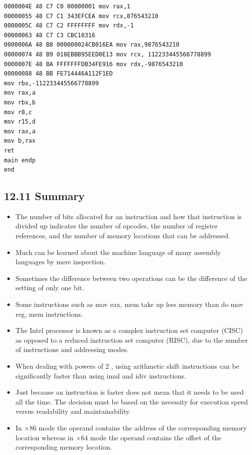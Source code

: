\documentclass[10pt]{book}
\begin{document}
\begin{verbatim}
0000004E 48 C7 C0 00000001 mov rax,1
00000055 48 C7 C1 343EFCEA mov rcx,876543210
0000005C 48 C7 C2 FFFFFFFF mov rdx,-1
00000063 48 C7 C3 CBC10316
0000006A 48 B8 000000024CB016EA mov rax,9876543210
00000074 48 B9 018EBBB95EED0E13 mov rcx, 112233445566778899
0000007E 48 BA FFFFFFFDB34FE916 mov rdx,-9876543210
00000088 48 BB FE714446A112F1ED
mov rbx,-112233445566778899
mov rax,a
mov rbx,b
mov r8,c
mov r15,d
mov rax,a
mov b,rax
ret
main endp
end
\end{verbatim}

\subsection*{12.11 Summary}
\begin{itemize}
  \item The number of bits allocated for an instruction and how that instruction is divided up indicates the number of opcodes, the number of register references, and the number of memory locations that can be addressed.
  \item Much can be learned about the machine language of many assembly languages by mere inspection.
  \item Sometimes the difference between two operations can be the difference of the setting of only one bit.
  \item Some instructions such as mov eax, mem take up less memory than do mov reg, mem instructions.
  \item The Intel processor is known as a complex instruction set computer (CISC) as opposed to a reduced instruction set computer (RISC), due to the number of instructions and addressing modes.
  \item When dealing with powers of 2 , using arithmetic shift instructions can be significantly faster than using imul and idiv instructions.
  \item Just because an instruction is faster does not mean that it needs to be used all the time. The decision must be based on the necessity for execution speed versus readability and maintainability.
  \item In $\times 86$ mode the operand contains the address of the corresponding memory location whereas in $\times 64$ mode the operand contains the offset of the corresponding memory location.
\end{itemize}
\end{document}
